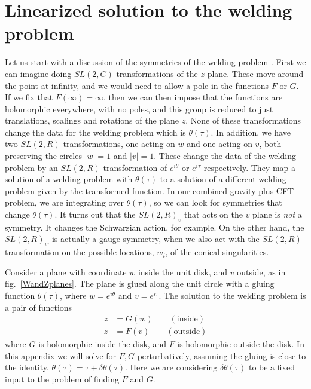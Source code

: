

\section{Linearized solution to the welding problem}
\label{app:welding}

Let us start with a discussion of the symmetries of the welding problem   . 
First we can imagine doing $SL(2,C)$ transformations of the $z$ plane. These move around the point at infinity, and we would need to   allow a pole  in the functions $F$ or $G$. If we fix that $F(\infty ) = \infty$, then we can then impose
that the functions are holomorphic everywhere, with no poles,  and this group is reduced to just translations, scalings and rotations of the plane $z$. 
None of these transformations change the data for the welding problem which is $\theta(\tau)$. 
In addition, we have two $SL(2,R)$ transformations, one acting on $w$ and one acting on $v$, both preserving the circles 
$|w|=1$ and $|v|=1$. These change the data 
of the welding problem by an $SL(2,R)$ transformation of $e^{ i \theta}$ or $e^{i \tau}$ respectively. They map a solution of a 
welding problem with $\theta(\tau)$ to a solution of a different welding problem given by the transformed function. 
In our combined gravity plus CFT problem, we are integrating over $\theta(\tau)$, so we can look for symmetries that change $\theta(\tau)$.  It turns out that the $SL(2,R)_v$ that acts on the $v$ plane is {\it not} a symmetry. It changes the 
Schwarzian action, for example. On the other hand, the $SL(2,R)_w$ is actually a    gauge symmetry, when we also act with the
$SL(2,R)$ transformation on the possible locations, $w_i$, of the conical singularities. 



Consider a plane with coordinate $w$ inside the unit disk, and $v$ outside, as in fig.~\ref{WandZplanes}. The plane is glued along the unit circle with a gluing function $\theta(\tau)$, where $w = e^{i\theta}$ and $v = e^{i\tau}$. The solution to the welding problem is a pair of functions
\begin{align}
z &= G(w) \qquad (\mbox{inside})\\
z &= F(v) \qquad (\mbox{outside})
\end{align}
where $G$ is holomorphic inside the disk, and $F$ is holomorphic outside the disk.  In this appendix we will solve for $F,G$ perturbatively, assuming the gluing is close to the identity, $\theta(\tau) = \tau + \delta \theta(\tau)$. Here we are considering $\delta \theta(\tau)$ to be a fixed input to the problem of finding $F$ and $G$.

